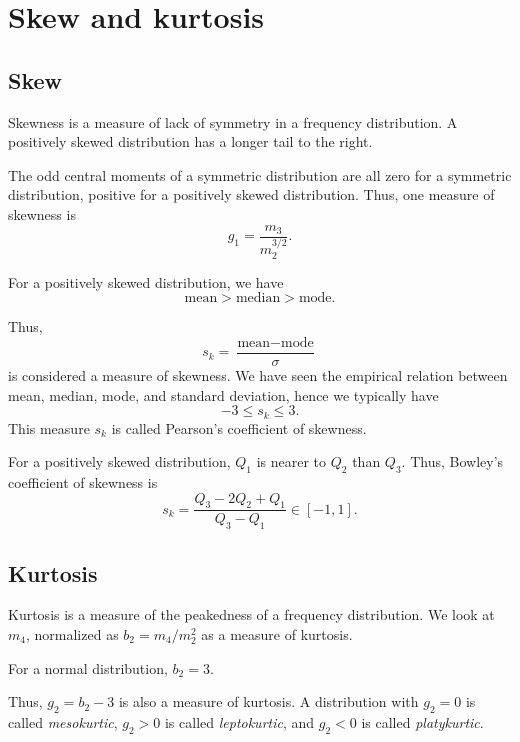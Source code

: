 \documentclass[11pt]{article}
\theoremstyle{definition}
\theoremstyle{remark}
\numberwithin{equation}{section}
\begin{document}
    \section{Skew and kurtosis}

    \subsection{Skew}
    
    Skewness is a measure of lack of symmetry in a frequency distribution. A
    positively skewed distribution has a longer tail to the right.

    The odd central moments of a symmetric distribution are all zero for a symmetric
    distribution, positive for a positively skewed distribution. Thus, one measure of
    skewness is \[
        g_1 = \frac{m_3}{m_2^{3 / 2}}.
    \]

    \begin{lemma}
        For a positively skewed distribution, we have \[
            \text{mean} > \text{median} > \text{mode}.
        \] 
    \end{lemma}

    Thus, \[
        s_k = \frac{\text{mean} - \text{mode}}{\sigma}
    \] is considered a measure of skewness. We have seen the empirical relation
    between mean, median, mode, and standard deviation, hence we typically have \[
        -3 \leq s_k \leq 3.
    \] This measure $s_k$ is called Pearson's coefficient of skewness.

    For a positively skewed distribution, $Q_1$ is nearer to $Q_2$ than $Q_3$. Thus,
    Bowley's coefficient of skewness is \[
        s_k = \frac{Q_3 - 2Q_2 + Q_1}{Q_3 - Q_1} \in [-1, 1].
    \]


    \subsection{Kurtosis}
    
    Kurtosis is a measure of the peakedness of a frequency distribution. We look at
    $m_4$, normalized as $b_2 = m_4 / m_2^2$ as a measure of kurtosis.

    \begin{lemma}
        For a normal distribution, $b_2 = 3$.
    \end{lemma}

    Thus, $g_2 = b_2 - 3$ is also a measure of kurtosis. A distribution with $g_2 =
    0$ is called \emph{mesokurtic}, $g_2 > 0$ is called \emph{leptokurtic}, and $g_2
    < 0$ is called \emph{platykurtic}.
\end{document}
